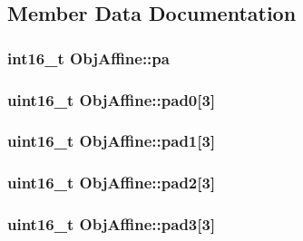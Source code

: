 \subsection{Member Data Documentation}
\hypertarget{struct_obj_affine_ae972edc100334aa968f79bb844763564}{
\subsubsection[{pa}]{\setlength{\rightskip}{0pt plus 5cm}int16\-\_\-t {\bf Obj\-Affine\-::pa}}}\label{struct_obj_affine_ae972edc100334aa968f79bb844763564}
\hypertarget{struct_obj_affine_a5fdab3616d01dfd6d8440bc61f02a0e4}{
\subsubsection[{pad0}]{\setlength{\rightskip}{0pt plus 5cm}uint16\-\_\-t {\bf Obj\-Affine\-::pad0}\mbox{[}3\mbox{]}}}\label{struct_obj_affine_a5fdab3616d01dfd6d8440bc61f02a0e4}
\hypertarget{struct_obj_affine_a88ec2e52a1bdabd87a59c8246e30a2ec}{
\subsubsection[{pad1}]{\setlength{\rightskip}{0pt plus 5cm}uint16\-\_\-t {\bf Obj\-Affine\-::pad1}\mbox{[}3\mbox{]}}}\label{struct_obj_affine_a88ec2e52a1bdabd87a59c8246e30a2ec}
\hypertarget{struct_obj_affine_af6e35040fbfc316b1fa138e11752fa46}{
\subsubsection[{pad2}]{\setlength{\rightskip}{0pt plus 5cm}uint16\-\_\-t {\bf Obj\-Affine\-::pad2}\mbox{[}3\mbox{]}}}\label{struct_obj_affine_af6e35040fbfc316b1fa138e11752fa46}
\hypertarget{struct_obj_affine_af0a9dcf2ed70d86454ed49f44a894021}{
\subsubsection[{pad3}]{\setlength{\rightskip}{0pt plus 5cm}uint16\-\_\-t {\bf Obj\-Affine\-::pad3}\mbox{[}3\mbox{]}}}\label{struct_obj_affine_af0a9dcf2ed70d86454ed49f44a894021}
